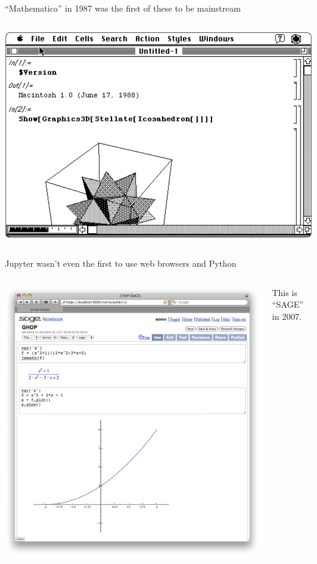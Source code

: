 \documentclass[aspectratio=169]{beamer}
\begin{document}
\begin{frame}{``Mathematica'' in 1987 was the first of these to be mainstream}
\vspace{0.2 cm}
\begin{columns}
\includegraphics[width=\linewidth]{img/screenshot-1987-mathematica.png}
\end{columns}
\end{frame}

\begin{frame}{Jupyter wasn't even the first to use web browsers and Python}
\vspace{0.2 cm}
\begin{columns}
\includegraphics[width=\linewidth]{img/screenshot-2007-sage.png}

\Large
This is ``SAGE'' in 2007.
\end{columns}
\end{frame}
\end{document}
